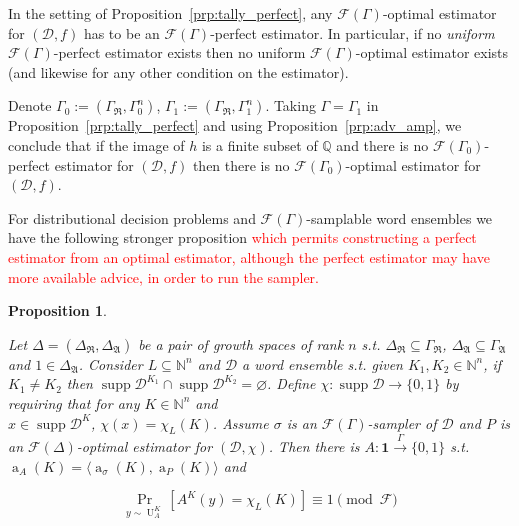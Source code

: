 \documentclass[11pt]{article}
\numberwithin{equation}{section}
\theoremstyle{definition}
\theoremstyle{plain}
\newtheorem{proposition}{Proposition}[section]
\newcommand{\Bool}{\{0,1\}}
\DeclareMathOperator{\Supp}{supp}
\DeclareMathOperator{\Prb}{Pr}
\DeclareMathOperator{\A}{a}
\DeclareMathOperator{\Un}{U}
\newcommand{\Nats}{\mathbb{N}}
\newcommand{\Rats}{\mathbb{Q}}
\newcommand{\Chev}[1]{\langle #1 \rangle}
\newcommand{\Dist}{\mathcal{D}}
\newcommand{\GrowR}{\Gamma_{\mathfrak{R}}}
\newcommand{\GrowA}{\Gamma_{\mathfrak{A}}}
\newcommand{\Fall}{\mathcal{F}}
\newcommand{\EG}{\Fall(\Gamma)}
\newcommand{\Scheme}{\xrightarrow{\Gamma}}
\begin{document}
In the setting of Proposition~\ref{prp:tally_perfect}, any ${\EG}$-optimal estimator for ${(\Dist,f)}$ has to be an ${\EG}$-perfect estimator. In particular, if no \emph{uniform} ${\EG}$-perfect estimator exists then no uniform ${\EG}$-optimal estimator exists (and likewise for any other condition on the estimator). 

Denote ${\Gamma_0:=(\GrowR,\Gamma_0^n)}$, ${\Gamma_1:=(\GrowR,\Gamma_1^n)}$. Taking ${\Gamma=\Gamma_1}$ in Proposition~\ref{prp:tally_perfect} and using Proposition~\ref{prp:adv_amp}, we conclude that if the image of ${h}$ is a finite subset of ${\Rats}$ and there is no ${\Fall(\Gamma_0)}$-perfect estimator for ${(\Dist,f)}$ then there is no ${\Fall(\Gamma_0)}$-optimal estimator for ${(\Dist,f)}$. 

For distributional decision problems and ${\EG}$-samplable word ensembles we have the following stronger proposition \textcolor{red}{which permits constructing a perfect estimator from an optimal estimator, although the perfect estimator may have more available advice, in order to run the sampler.}

\begin{samepage}
\begin{proposition}
\label{prp:tally_smp_bpp}

Let ${\Delta=(\Delta_{\mathfrak{R}}, \Delta_{\mathfrak{A}})}$ be a pair of growth spaces of rank ${n}$ s.t. ${\Delta_{\mathfrak{R}} \subseteq \GrowR}$, ${\Delta_{\mathfrak{A}} \subseteq \GrowA}$ and ${1 \in \Delta_{\mathfrak{A}}}$. Consider ${L \subseteq \Nats^n}$ and ${\Dist}$ a word ensemble s.t. given ${K_1, K_2 \in \Nats^n}$, if ${K_1 \ne K_2}$ then ${\Supp \Dist^{K_1} \cap \Supp \Dist^{K_2} = \varnothing}$. Define ${\chi: \Supp \Dist \rightarrow \Bool}$ by requiring that for any ${K \in \Nats^n}$ and\\ $x \in \Supp \Dist^K$, ${\chi(x)=\chi_L(K)}$. Assume ${\sigma}$ is an ${\EG}$-sampler of ${\Dist}$ and ${P}$ is an ${\Fall(\Delta)}$-optimal estimator for ${(\Dist, \chi)}$. Then there is ${A: \bm{1} \Scheme \Bool}$ s.t. ${\A_A(K)=\Chev{\A_\sigma(K),\A_P(K)}}$ and

\begin{equation}
\Prb_{y \sim \Un_A^K}[A^K(y)=\chi_L(K)] \equiv 1 \pmod \Fall
\end{equation}

\end{proposition}
\end{samepage}
\end{document}
